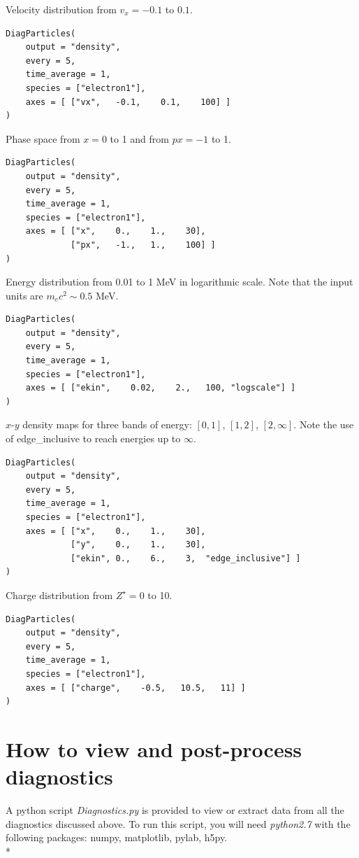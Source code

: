 \documentclass[11pt]{article}
\newcommand{\code}[1]{\colorbox{yellow!15}{\ttfamily #1}}
\begin{document}
Velocity distribution from $v_x = -0.1$ to $0.1$.
\begin{lstlisting}
DiagParticles(
	output = "density",
	every = 5,
	time_average = 1,
	species = ["electron1"],
	axes = [ ["vx",   -0.1,    0.1,    100] ]
)
\end{lstlisting}

Phase space from $x=0$ to 1 and from $px=-1$ to 1.
\begin{lstlisting}
DiagParticles(
	output = "density",
	every = 5,
	time_average = 1,
	species = ["electron1"],
	axes = [ ["x",    0.,    1.,    30],
	         ["px",   -1.,   1.,    100] ]
)
\end{lstlisting}

Energy distribution from 0.01 to 1 MeV in logarithmic scale.
Note that the input units are $m_ec^2 \sim 0.5$ MeV.
\begin{lstlisting}
DiagParticles(
	output = "density",
	every = 5,
	time_average = 1,
	species = ["electron1"],
	axes = [ ["ekin",    0.02,    2.,   100, "logscale"] ]
)
\end{lstlisting}
\clearpage

$x$-$y$ density maps for three bands of energy: $[0,1]$, $[1,2]$, $[2,\infty]$.
Note the use of \code{edge\_inclusive} to reach energies up to $\infty$.
\begin{lstlisting}
DiagParticles(
	output = "density",
	every = 5,
	time_average = 1,
	species = ["electron1"],
	axes = [ ["x",    0.,    1.,    30],
	         ["y",    0.,    1.,    30],
	         ["ekin", 0.,    6.,    3,  "edge_inclusive"] ]
)
\end{lstlisting}

Charge distribution from $Z^\star =0$ to 10.
\begin{lstlisting}
DiagParticles(
	output = "density",
	every = 5,
	time_average = 1,
	species = ["electron1"],
	axes = [ ["charge",    -0.5,   10.5,   11] ]
)
\end{lstlisting}


\clearpage


\section{How to view and post-process diagnostics}

A python script \textit{Diagnostics.py} is provided to view or extract data from all the diagnostics discussed above.
To run this script, you will need \textit{python2.7} with the following packages: numpy, matplotlib, pylab, h5py.
\\*
\end{document}
